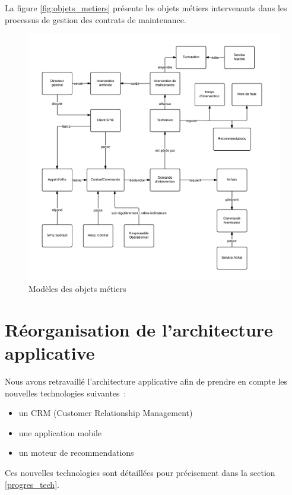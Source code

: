 La figure \vref{fig:objets_metiers} présente les objets métiers intervenants dans les processus de gestion des contrats de maintenance.

\begin{figure}[h!]
	\centering
	\includegraphics[width=1\linewidth]{images/modele_objet_metier.png}
	\caption{Modèles des objets métiers}
	\label{fig:objets_metiers}
\end{figure}


\pagebreak
\section{Réorganisation de l'architecture applicative}

Nous avons retravaillé l'architecture applicative afin de prendre en compte les nouvelles technologies suivantes~:

    \begin{itemize}
        \item un CRM (Customer Relationship Management)
        \item une application mobile
        \item un moteur de recommendations
    \end{itemize}

Ces nouvelles technologies sont détaillées pour précisement dans la section \vref{progres_tech}.

